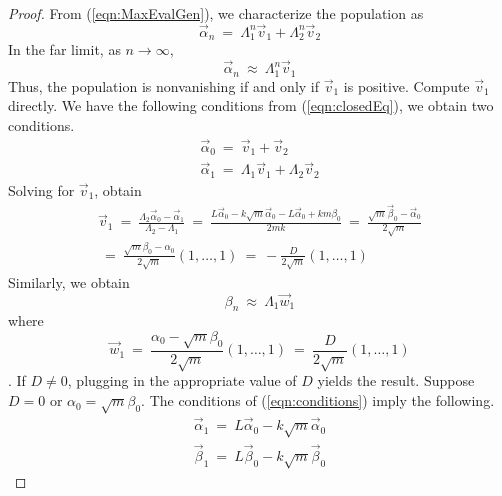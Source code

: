 \documentclass{article}
\numberwithin{equation}{section}
\begin{document}
\begin{proof}
    From (\ref{eqn:MaxEvalGen}), we characterize the population as
    \begin{equation}\label{eqn:closedEq}
    \vec \alpha_n \ =\ \Lambda_1^{n}  \vec v_1+ \Lambda_2^{n}\vec v_2
    \end{equation}
    In the far limit, as $n \rightarrow \infty$, 
    \begin{equation}
    \vec \alpha_n \ \approx\ \Lambda_1^{n}  \vec v_1
    \end{equation}
    Thus, the population is nonvanishing if and only if $\vec v_1$ 
    is positive. Compute $\vec v_1$ directly. We have the following conditions 
    from (\ref{eqn:closedEq}), we obtain two conditions. 
    \begin{eqnarray}
        \vec \alpha_0 \ = \ \vec v_1 + \vec v_2 \nonumber \\ 
        \vec \alpha_1 \ = \ \Lambda_1 \vec v_1 + \Lambda_2 \vec v_2
    \end{eqnarray}
    Solving for $\vec v_1$, obtain 
    \begin{equation}
        \begin{split}
        \vec v_1 \ = \ \frac {\Lambda_2 \vec\alpha_0 - \vec\alpha_1} {\Lambda_2 - \Lambda_1}
        \ = \ 
        \frac {L\vec \alpha_0 - k\sqrt m \vec \alpha_0 - L \vec \alpha_0 + km\beta_0} {2mk} 
        \ = \ 
        \frac {\sqrt{m}\vec\beta_0 -  \vec \alpha_0} {2\sqrt m} \\ 
        \ = \ \frac {\sqrt m \beta_0 - \alpha_0} {2 \sqrt m} (1, \dots, 1) 
        \ = \ -\frac D{2\sqrt m} (1, \dots, 1) 
        \end{split}
    \end{equation}
    Similarly, we obtain 
    \begin{equation}
        \beta_n \ \approx \ \Lambda_1 \vec w_1  
    \end{equation}
    where 
    \begin{equation}
        \vec w_1 \ = \ \frac{\alpha_0 - \sqrt m \beta_0} {2 \sqrt m} (1, \dots, 1)
        \ = \ \frac D {2\sqrt m }(1, \dots, 1)
    \end{equation}
    . If $D \neq 0$, plugging in the appropriate value of $D$ yields 
    the result. Suppose $D = 0$ or $\alpha_0 = \sqrt m \beta _0$. The 
    conditions of (\ref{eqn:conditions}) imply the following. 
    \begin{eqnarray}
        \vec \alpha_1  \ = \ L \vec \alpha_0 - k \sqrt m \vec \alpha_0 \nonumber \\ 
        \vec \beta_1 \ = \ L \vec \beta_0 - k \sqrt m \vec \beta_0

\end{eqnarray}
\end{proof}
\end{document}
